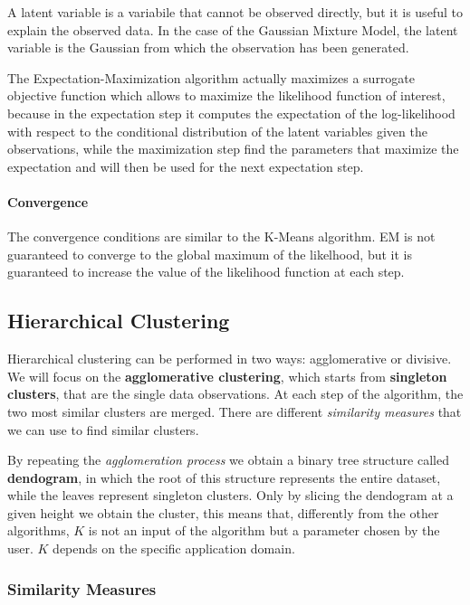 A latent variable is a variabile that cannot be observed directly, but it is useful to explain the observed data. In the case of the Gaussian Mixture Model, the latent variable is the Gaussian from which the observation has been generated.

The Expectation-Maximization algorithm actually maximizes a surrogate objective function which allows to maximize the likelihood function of interest, because in the expectation step it computes the expectation of the log-likelihood with respect to the conditional distribution of the latent variables given the observations, while the maximization step find the parameters that maximize the expectation and will then be used for the next expectation step.

\paragraph*{Convergence}
The convergence conditions are similar to the K-Means algorithm. EM is not guaranteed to converge to the global maximum of the likelhood, but it is guaranteed to increase the value of the likelihood function at each step.

\subsection{Hierarchical Clustering}
Hierarchical clustering can be performed in two ways: agglomerative or divisive.
We will focus on the \textbf{agglomerative clustering}, which starts from \textbf{singleton clusters}, that are the single data observations. At each step of the algorithm, the two most similar clusters are merged. There are different \textit{similarity measures} that we can use to find similar clusters.

By repeating the \textit{agglomeration process} we obtain a binary tree structure called \textbf{dendogram}, in which the root of this structure represents the entire dataset, while the leaves represent singleton clusters. Only by slicing the dendogram at a given height we obtain the cluster, this means that, differently from the other algorithms, $K$ is not an input of the algorithm but a parameter chosen by the user. $K$ depends on the specific application domain.

\subsubsection{Similarity Measures}

